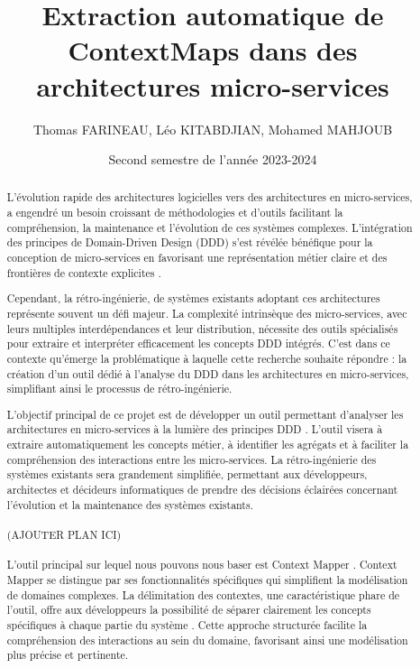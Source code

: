 \documentclass{rapport}
\title{Extraction automatique de ContextMaps dans des architectures micro-services}
\author{Thomas FARINEAU, Léo KITABDJIAN, Mohamed MAHJOUB}
\date{Second semestre de l'année 2023-2024}
\begin{document}
  \maketitle
    \begin{abstract}
L'évolution rapide des architectures logicielles vers des architectures en micro-services, a engendré un besoin croissant de méthodologies et d'outils facilitant la compréhension, la maintenance et l'évolution de ces systèmes complexes. L'intégration des principes de Domain-Driven Design (DDD)  s'est révélée bénéfique pour la conception de micro-services en favorisant une représentation métier claire et des frontières de contexte explicites \cite{articleDDD}.

Cependant, la rétro-ingénierie, de systèmes existants adoptant ces architectures représente souvent un défi majeur. La complexité intrinsèque des micro-services, avec leurs multiples interdépendances et leur distribution, nécessite des outils spécialisés pour extraire et interpréter efficacement les concepts DDD intégrés. C'est dans ce contexte qu'émerge la problématique à laquelle cette recherche souhaite répondre : la création d'un outil dédié à l'analyse du DDD dans les architectures en micro-services, simplifiant ainsi le processus de rétro-ingénierie.

L'objectif principal de ce projet est de développer un outil permettant d'analyser les architectures en micro-services à la lumière des principes DDD \cite{evans2003,vernon2013}. L'outil visera à extraire automatiquement les concepts métier, à identifier les agrégats et à faciliter la compréhension des interactions entre les micro-services. La rétro-ingénierie des systèmes existants sera grandement simplifiée, permettant aux développeurs, architectes et décideurs informatiques de prendre des décisions éclairées concernant l'évolution et la maintenance des systèmes existants.\\\\
(AJOUTER PLAN ICI)\\\\

L'outil principal sur lequel nous pouvons nous baser est Context Mapper \cite{contextmapper,contextMapperGitHub}. Context Mapper se distingue par ses fonctionnalités spécifiques qui simplifient la modélisation de domaines complexes. La délimitation des contextes, une caractéristique phare de l'outil, offre aux développeurs la possibilité de séparer clairement les concepts spécifiques à chaque partie du système \cite{mdslMedium2021}. Cette approche structurée facilite la compréhension des interactions au sein du domaine, favorisant ainsi une modélisation plus précise et pertinente.


\end{abstract}
\end{document}
